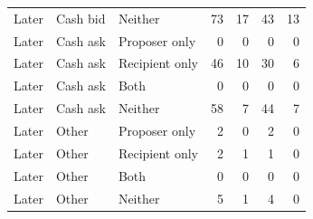 \begin{longtable}{@{}lllrrrr@{}}
Later & Cash bid & Neither & 73 & 17 & 43 & 13 \\
Later & Cash ask & Proposer only & 0 & 0 & 0 & 0 \\
Later & Cash ask & Recipient only & 46 & 10 & 30 & 6 \\
Later & Cash ask & Both & 0 & 0 & 0 & 0 \\
Later & Cash ask & Neither & 58 & 7 & 44 & 7 \\
Later & Other & Proposer only & 2 & 0 & 2 & 0 \\
Later & Other & Recipient only & 2 & 1 & 1 & 0 \\
Later & Other & Both & 0 & 0 & 0 & 0 \\
Later & Other & Neither & 5 & 1 & 4 & 0 \\\bottomrule\end{longtable}
